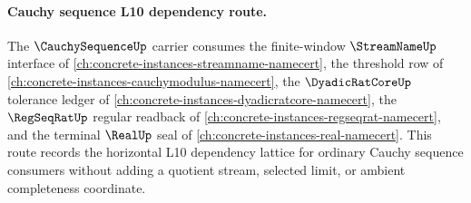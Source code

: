 \paragraph{Cauchy sequence L10 dependency route.}
The $\CauchySequenceUp$ carrier consumes the finite-window $\StreamNameUp$ interface of \autoref{ch:concrete-instances-streamname-namecert}, the threshold row of \autoref{ch:concrete-instances-cauchymodulus-namecert}, the $\DyadicRatCoreUp$ tolerance ledger of \autoref{ch:concrete-instances-dyadicratcore-namecert}, the $\RegSeqRatUp$ regular readback of \autoref{ch:concrete-instances-regseqrat-namecert}, and the terminal $\RealUp$ seal of \autoref{ch:concrete-instances-real-namecert}. This route records the horizontal L10 dependency lattice for ordinary Cauchy sequence consumers without adding a quotient stream, selected limit, or ambient completeness coordinate.
